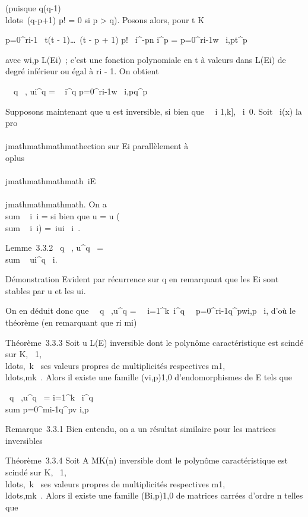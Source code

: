 (puisque 
q(q-1)\\ldots~(q-p+1)
\over p! = 0 si p \textgreater{} q). Posons alors, pour
t \in K

\sum p=0^ri-1~ t(t -
1)\ldots~(t - p + 1) \over
p! \lambda~i^-pn i^p =
\sum p=0^ri-1w~
i,pt^p

avec wi,p \in L(Ei)~; c'est une fonction polynomiale
en t à valeurs dans L(Ei) de degré inférieur ou égal à
ri - 1. On obtient

\forall~~q \in {}~,\quad
ui^q = \lambda~ i^q
\sum p=0^ri-1w~
i,pq^p

Supposons maintenant que u est inversible, si bien que
\forall~~i \in {[}1,k{]},
\lambda~i\neq~0. Soit \pi~i(x) la
pro\\\\jmathmathmathmathection sur Ei parallèlement à
\\oplus~ ~
\\\\jmathmathmathmath\neq~iE\\\\jmathmathmathmath. On a
\\sum ~
i\pi~i = \mathrmIdE si bien
que u = u \cdot (\\sum ~
i\pi~i) =\
\sum  iui \cdot \pi~i~.

Lemme~3.3.2 \forall~q \in {}~, u^q~
= \\sum ~
ui^q \cdot \pi~i.

Démonstration Evident par récurrence sur q en remarquant que les
Ei sont stables par u et les ui.

On en déduit donc que \forall~~q \in
{}~,\quad u^q =\
\sum ~
i=1^k\lambda~i^q\
\sum ~
p=0^ri-1q^pwi,p \cdot
\pi~i, d'où le théorème (en remarquant que ri \leq
mi)

Théorème~3.3.3 Soit u \in L(E) inversible dont le polynôme caractéristique
est scindé sur K,
\lambda~1,\\ldots,\lambda~k~
ses valeurs propres de multiplicités respectives
m1,\\ldots,mk~.
Alors il existe une famille
(vi,p)1\leqi\leqk,0\leqp\leqmi-1 d'endomorphismes de E
tels que

\forall~q \in \mathbb{N}~,\quad u^q~ =
\sum i=1^k\lambda~ i^q~
\\sum
p=0^mi-1q^pv i,p

Remarque~3.3.1 Bien entendu, on a un résultat similaire pour les
matrices inversibles

Théorème~3.3.4 Soit A \in MK(n) inversible dont le polynôme
caractéristique est scindé sur K,
\lambda~1,\\ldots,\lambda~k~
ses valeurs propres de multiplicités respectives
m1,\\ldots,mk~.
Alors il existe une famille
(Bi,p)1\leqi\leqk,0\leqp\leqmi-1 de matrices carrées
d'ordre n telles que

